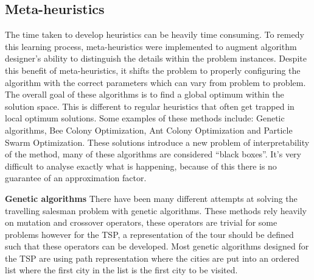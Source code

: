 \documentclass[]{UCD_CS_FYP_Report}
\begin{document}
\subsection{Meta-heuristics}
The time taken to develop heuristics can be heavily time consuming. To remedy this learning process, meta-heuristics were implemented to augment algorithm designer’s ability to distinguish the details within the problem instances. Despite this benefit of meta-heuristics, it shifts the problem to properly configuring the algorithm with the correct parameters which can vary from problem to problem. The overall goal of these algorithms is to find a global optimum within the solution space. This is different to regular heuristics that often get trapped in local optimum solutions. Some examples of these methods include: Genetic algorithms, Bee Colony Optimization, Ant Colony Optimization and Particle Swarm Optimization. These solutions introduce a new problem of interpretability of the method, many of these algorithms are considered “black boxes”. It’s very difficult to analyse exactly what is happening, because of this there is no guarantee of an approximation factor.

\textbf{Genetic algorithms}
There have been many different attempts at solving the travelling salesman problem with genetic algorithms. These methods rely heavily on mutation and crossover operators, these operators are trivial for some problems however for the TSP, a representation of the tour should be defined such that these operators can be developed. Most genetic algorithms designed for the TSP are using path representation where the cities are put into an ordered list where the first city in the list is the first city to be visited. \cite{Larranaga1999}
\end{document}
